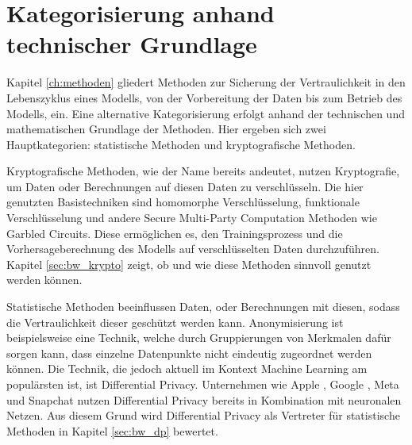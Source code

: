 \section{Kategorisierung anhand technischer Grundlage}
Kapitel \ref{ch:methoden} gliedert Methoden zur Sicherung der Vertraulichkeit in den Lebenszyklus eines Modells, von der Vorbereitung der Daten bis zum Betrieb des Modells, ein. 
Eine alternative Kategorisierung erfolgt anhand der technischen und mathematischen Grundlage der Methoden.
Hier ergeben sich zwei Hauptkategorien: statistische Methoden und kryptografische Methoden.

Kryptografische Methoden, wie der Name bereits andeutet, nutzen Kryptografie, um Daten oder Berechnungen auf diesen Daten zu verschlüsseln.
Die hier genutzten Basistechniken sind homomorphe Verschlüsselung, funktionale Verschlüsselung und andere Secure Multi-Party Computation Methoden wie Garbled Circuits.
Diese ermöglichen es, den Trainingsprozess und die Vorhersageberechnung des Modells auf verschlüsselten Daten durchzuführen.
Kapitel \ref{sec:bw_krypto} zeigt, ob und wie diese Methoden sinnvoll genutzt werden können.

Statistische Methoden beeinflussen Daten, oder Berechnungen mit diesen, sodass die Vertraulichkeit dieser geschützt werden kann.
Anonymisierung ist beispielsweise eine Technik, welche durch Gruppierungen von Merkmalen dafür sorgen kann, dass einzelne Datenpunkte nicht eindeutig zugeordnet werden können.
Die Technik, die jedoch aktuell im Kontext Machine Learning am populärsten ist, ist Differential Privacy. 
Unternehmen wie Apple \cite{apple_dp}, Google \cite{google_dp}, Meta \cite{meta_dp} und Snapchat \cite{snapchat_dp} nutzen Differential Privacy bereits in Kombination mit neuronalen Netzen.
Aus diesem Grund wird Differential Privacy als Vertreter für statistische Methoden in Kapitel \ref{sec:bw_dp} bewertet.